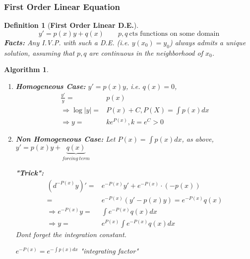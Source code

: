\documentclass[12pt]{article}
\theoremstyle{plain}
\newtheorem{definition}{Definition}[subsection]
\newtheorem{algorithm}{Algorithm}[subsection]
\newcommand{\abs}[1]{\left| #1 \right|}
\begin{document}
	\subsubsection{First Order Linear Equation}
	\begin{definition}[\textbf{First Order Linear D.E.}]
		\[
			y' = p(x)y + q(x)  \qquad p, q \ \text{cts functions on some domain}
		\]
		\textbf{Facts:} Any I.V.P. with such a D.E. (i.e. $y(x_0) = y_0$)
		always admits a unique solution, assuming that $p, q$ are continuous in
		the neighborhood of $x_0$.	\\
	\end{definition}
	\begin{algorithm}
	$ $
	\begin{enumerate}
	\item \textbf{Homogeneous Case: }
	$y'=p(x)y$, i.e. $q(x) = 0$, 
	\begin{align*}
		\frac {y'}{y} =& p(x) \\
		\Rightarrow \log\abs{y} =& P(x) + C, P(X) = \int p(x) dx\\
		\Rightarrow y =& ke^{P(x)}, k = e^C > 0
	\end{align*}
	
	\item \textbf{Non Homogeneous Case: }
	Let $P(x) = \int p(x)dx$, as above,
	$y' = p(x) y + \underbrace{q(x)}_{forcing \ term}$ 

	\textbf{"Trick": }
	\begin{align*}
		(d^{-P(x)} y)' 
		=& e^{-P(x)}y' + e^{-P(x)} \cdot (-p(x))\\
		=& e^{-P(x)} (y' - p(x) y) = e^{-P(x)}q(x)\\
		\Rightarrow
		e^{-P(x)} y = &\int e^{-P(x)} q(x)dx \\
		\Rightarrow y =& e^{P(x)} \int e^{-P(x)} q(x)dx
	\end{align*}
	Dont forget the integration constant. 

	$e^{-P(x)} = e^{-\int p(x)dx}$ "integrating factor"	\\
	\end{enumerate}
	\end{algorithm}
\end{document}

